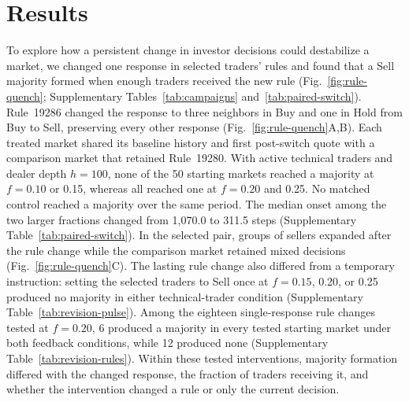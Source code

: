\section{Results}

To explore how a persistent change in investor decisions could destabilize
a market, we changed one response in selected traders' rules and found
that a Sell majority formed when enough traders received the new rule
(Fig.~\ref{fig:rule-quench}; Supplementary Tables~\ref{tab:campaigns}
and~\ref{tab:paired-switch}).
Rule~19286 changed the response to three neighbors in Buy and one in Hold
from Buy to Sell, preserving every other response
(Fig.~\ref{fig:rule-quench}A,B). Each treated market shared its baseline
history and first post-switch quote with a comparison market that retained
Rule~19280. With active technical traders and dealer depth $h=100$, none
of the 50 starting markets reached a majority at $f=0.10$ or 0.15, whereas
all reached one at $f=0.20$ and 0.25. No matched control reached a majority
over the same period. The median onset among the two larger fractions
changed from 1,070.0 to 311.5
steps (Supplementary Table~\ref{tab:paired-switch}). In the selected
pair, groups of sellers expanded after the rule change while the
comparison market retained mixed decisions (Fig.~\ref{fig:rule-quench}C).
The lasting rule change also differed from a temporary instruction:
setting the selected traders to Sell once at $f=0.15$, 0.20, or 0.25
produced no majority in either technical-trader condition (Supplementary Table~\ref{tab:revision-pulse}).
Among the eighteen single-response rule changes tested at $f=0.20$,
6 produced a majority in every tested starting market under both feedback conditions, while 12 produced none (Supplementary Table~\ref{tab:revision-rules}).
Within these tested interventions, majority formation differed with the
changed response, the fraction of traders receiving it, and whether the
intervention changed a rule or only the current decision.

